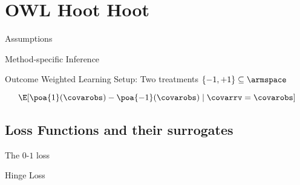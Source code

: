 \section{OWL Hoot Hoot}
\begin{frame}{Assumptions}
\end{frame}

\begin{frame}{Method-specific Inference}
\end{frame}


\begin{frame}{Outcome Weighted Learning}
	Setup: Two treatments $\{-1, +1\} \subseteq \armspace$

	$$\E[\poa{1}(\covarobs) - \poa{-1}(\covarobs) \mid \covarrv = \covarobs]$$

\end{frame}

\begin{frame}{}
\end{frame}


\subsection{Loss Functions and their surrogates}
\begin{frame}{The $0$-$1$ loss}
\end{frame}

\begin{frame}{Hinge Loss}
\end{frame}


